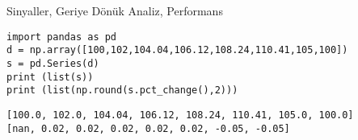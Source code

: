 \documentclass[12pt,fleqn]{article}\usepackage{../../common}
\begin{document}
Sinyaller, Geriye Dönük Analiz, Performans




\begin{verbatim}
import pandas as pd
d = np.array([100,102,104.04,106.12,108.24,110.41,105,100])
s = pd.Series(d)
print (list(s))
print (list(np.round(s.pct_change(),2)))
\end{verbatim}

\begin{verbatim}
[100.0, 102.0, 104.04, 106.12, 108.24, 110.41, 105.0, 100.0]
[nan, 0.02, 0.02, 0.02, 0.02, 0.02, -0.05, -0.05]
\end{verbatim}
\end{document}
